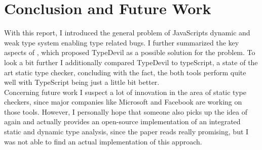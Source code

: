 \documentclass[runningheads,a4paper]{llncs}
\begin{document}
\newpage
\section{Conclusion and Future Work}
With this report, I introduced the general problem of JavaScripts dynamic and weak type system enabling type related bugs.
I further summarized the key aspects of \cite{DBLP:conf/icse/PradelSS15}, which proposed TypeDevil as a possible solution for the problem.
To look a bit further I additionally compared TypeDevil to typeScript, a state of the art static type checker, concluding with the fact, the both tools perform quite well with TypeScript being just a little bit better.\\
Concerning future work I suspect a lot of innovation in the area of static type checkers, since major companies like Microsoft and Facebook are working on those tools.
However, I personally hope that someone also picks up the idea of \cite{DBLP:conf/icse/TanXCLYS17} again and actually provides an open-source implementation of an integrated static and dynamic type analysis, since the paper reads really promising, but I was not able to find an actual implementation of this approach.  


\lstlistoflistings %
\listoffigures %

\newpage

{}

\end{document}
